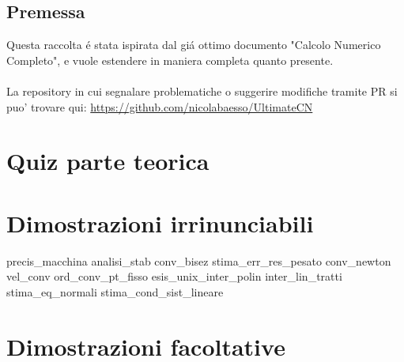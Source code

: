 \documentclass[12pt,a4paper,headings=optiontohead]{article}
\begin{document}
\begin{center}
\pagebreak

\section*{Premessa}
\begin{minipage}{0.9\textwidth} \large

Questa raccolta é stata ispirata dal giá ottimo documento "Calcolo Numerico Completo", e vuole estendere in maniera completa quanto presente.\\\\
La repository in cui segnalare problematiche o suggerire modifiche tramite PR si puo' trovare qui: \href{https://github.com/nicolabaesso/UltimateCN}{https://github.com/nicolabaesso/UltimateCN}

\end{minipage}

\end{center}
\pagebreak


\tableofcontents
\section{Quiz parte teorica}

\section{Dimostrazioni irrinunciabili}
{precis_macchina}
\newpage
{analisi_stab}
{conv_bisez}
\newpage
{stima_err_res_pesato}
\newpage
{conv_newton}
\newpage
{vel_conv}
\newpage
{ord_conv_pt_fisso}
\newpage
{esis_unix_inter_polin}
\newpage
{inter_lin_tratti}
\newpage
{stima_eq_normali}
\newpage
{stima_cond_sist_lineare}
\newpage
\section{Dimostrazioni facoltative}
\end{document}
